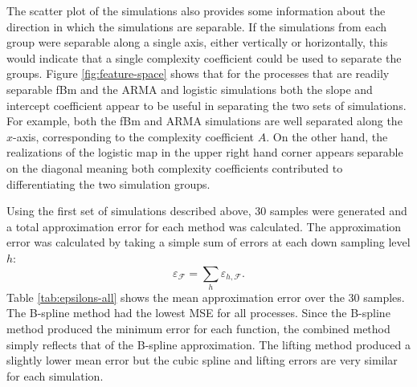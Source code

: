The scatter plot of the simulations also provides some information 
about the direction in which the simulations are separable. If the 
simulations from each group were separable along a single axis, 
either vertically or horizontally, this would indicate that a single
complexity coefficient could be used to separate the groups.
 Figure \ref{fig:feature-space} shows that for the processes that are readily separable \textemdash fBm and the ARMA and logistic simulations \textemdash both the slope and intercept coefficient appear to be useful in separating the two sets of simulations. For example, both the fBm and ARMA simulations are well separated along the $x$-axis, corresponding
 to the complexity coefficient $A$. On the other hand, the realizations of the logistic map in the upper right hand corner appears separable on the diagonal meaning both complexity coefficients contributed to differentiating the two simulation groups.

Using the first set of simulations described above, 30 samples were 
generated and a total approximation error for each method was calculated. 
The approximation error was calculated by 
taking a simple sum of errors at each down sampling level $h$: 
\[
  \varepsilon_{\mathcal{F}} = \sum_{h} \varepsilon_{h, \mathcal{F}}.
\]
Table \ref{tab:epsilons-all} shows the mean approximation error 
over the 30 samples.
The B-spline method had the lowest MSE for all processes.
Since the B-spline method produced the minimum 
error for each function, the combined method 
simply reflects that of the B-spline approximation.
The lifting method produced a slightly lower mean error but 
the cubic spline and lifting errors are very similar for each
simulation. 


